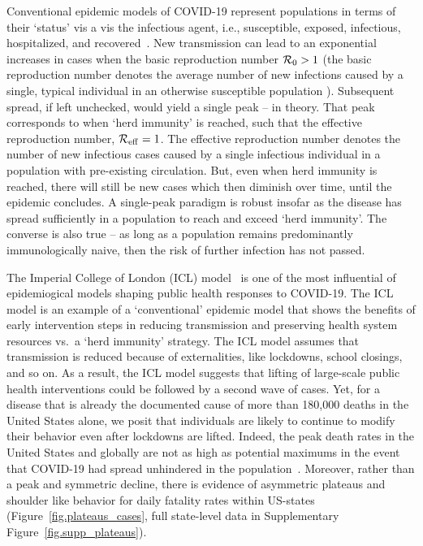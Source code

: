 Conventional epidemic
models of COVID-19 represent populations in terms of their `status' vis
a vis the infectious agent, i.e., susceptible, exposed, infectious,
hospitalized, and recovered~\citep{ferguson2020report,kucharski2020early,kissler_medrxiv2020,park_medrxiv2020,kraemer_2020sci,li_science2020,wu_2020natmed}.
New transmission can lead to an exponential increases in cases 
when the basic reproduction number ${\cal{R}}_0>1$ (the
basic reproduction number denotes the average number of new
infections caused by a single, typical individual in an otherwise
susceptible population \citep{anderson1991infectious}).  Subsequent
spread, if left unchecked, would yield a single peak -- in theory. That 
peak corresponds to when `herd immunity' is reached, such
that the effective reproduction number, ${\cal{R}}_{\mathrm{eff}}=1$.
The effective reproduction number denotes the number of new
infectious cases caused by a single infectious individual
in a population with pre-existing circulation.
But, even when herd immunity is reached, there will still be new cases 
which then diminish over time, until the epidemic concludes.  
A single-peak paradigm is
robust insofar as the disease has spread
sufficiently in a population to reach and exceed `herd immunity'.
The converse
is also true  -- as long as 
a population remains predominantly immunologically
naive, then the risk of further infection has not passed. 

The Imperial College of London (ICL) model~\citep{ferguson2020report} is
one of the most influential of 
epidemiogical models shaping public health responses to COVID-19. The ICL model is an
example of a `conventional' epidemic model
that shows the benefits of  early intervention steps in reducing
transmission and preserving health system resources vs.~a `herd immunity' strategy.  
The ICL model assumes that
transmission is reduced because of externalities, like lockdowns,
school closings, and so on.  
As a result, the ICL model suggests that lifting of large-scale
public health interventions could be followed by a second wave of cases.
Yet, for a disease
that is already the documented cause of more than 180,000 deaths
in the United States alone, we posit that individuals
are likely to continue to modify
their behavior even after lockdowns are lifted.  
Indeed, the peak death rates in the United States and globally
are not as high as potential maximums in the event that
COVID-19 had spread unhindered in the population~\citep{ferguson2020report}. 
Moreover, rather than a peak and symmetric decline, there is evidence 
of asymmetric plateaus and shoulder like
behavior for daily fatality rates within US-states
(Figure~\ref{fig.plateaus_cases}, full state-level data in Supplementary
Figure~\ref{fig.supp_plateaus}).   

